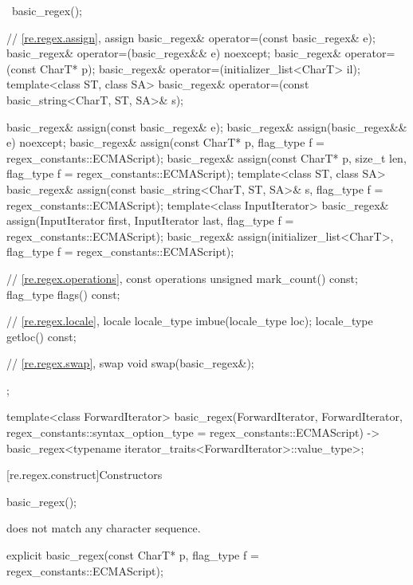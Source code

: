 \begin{codeblock}
{{      ~basic_regex();

      // \ref{re.regex.assign}, assign
      basic_regex& operator=(const basic_regex& e);
      basic_regex& operator=(basic_regex&& e) noexcept;
      basic_regex& operator=(const CharT* p);
      basic_regex& operator=(initializer_list<CharT> il);
      template<class ST, class SA>
        basic_regex& operator=(const basic_string<CharT, ST, SA>& s);

      basic_regex& assign(const basic_regex& e);
      basic_regex& assign(basic_regex&& e) noexcept;
      basic_regex& assign(const CharT* p, flag_type f = regex_constants::ECMAScript);
      basic_regex& assign(const CharT* p, size_t len, flag_type f = regex_constants::ECMAScript);
      template<class ST, class SA>
        basic_regex& assign(const basic_string<CharT, ST, SA>& s,
                            flag_type f = regex_constants::ECMAScript);
      template<class InputIterator>
        basic_regex& assign(InputIterator first, InputIterator last,
                            flag_type f = regex_constants::ECMAScript);
      basic_regex& assign(initializer_list<CharT>,
                          flag_type f = regex_constants::ECMAScript);

      // \ref{re.regex.operations}, const operations
      unsigned mark_count() const;
      flag_type flags() const;

      // \ref{re.regex.locale}, locale
      locale_type imbue(locale_type loc);
      locale_type getloc() const;

      // \ref{re.regex.swap}, swap
      void swap(basic_regex&);
    };

  template<class ForwardIterator>
    basic_regex(ForwardIterator, ForwardIterator,
                regex_constants::syntax_option_type = regex_constants::ECMAScript)
      -> basic_regex<typename iterator_traits<ForwardIterator>::value_type>;
}
\end{codeblock}

[re.regex.construct]{Constructors}

%
\begin{itemdecl}
basic_regex();
\end{itemdecl}

\begin{itemdescr}
\pnum
\ensures
{} does not match any character sequence.
\end{itemdescr}

%
\begin{itemdecl}
explicit basic_regex(const CharT* p, flag_type f = regex_constants::ECMAScript);
\end{itemdecl}

